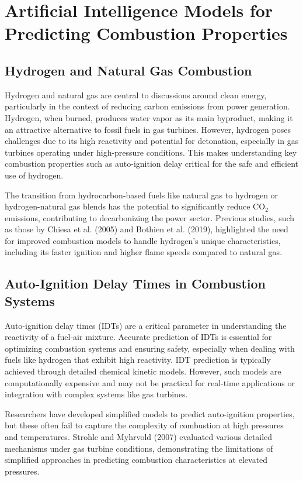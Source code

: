 \documentclass[12pt]{report}
\begin{document}


\section{Artificial Intelligence Models for Predicting Combustion Properties}

\subsection{Hydrogen and Natural Gas Combustion}
Hydrogen and natural gas are central to discussions around clean energy, particularly in the context of reducing carbon emissions from power generation. Hydrogen, when burned, produces water vapor as its main byproduct, making it an attractive alternative to fossil fuels in gas turbines. However, hydrogen poses challenges due to its high reactivity and potential for detonation, especially in gas turbines operating under high-pressure conditions. This makes understanding key combustion properties such as auto-ignition delay critical for the safe and efficient use of hydrogen.

The transition from hydrocarbon-based fuels like natural gas to hydrogen or hydrogen-natural gas blends has the potential to significantly reduce CO$_2$ emissions, contributing to decarbonizing the power sector. Previous studies, such as those by Chiesa et al. (2005) and Bothien et al. (2019), highlighted the need for improved combustion models to handle hydrogen’s unique characteristics, including its faster ignition and higher flame speeds compared to natural gas.

\subsection{Auto-Ignition Delay Times in Combustion Systems}
Auto-ignition delay times (IDTs) are a critical parameter in understanding the reactivity of a fuel-air mixture. Accurate prediction of IDTs is essential for optimizing combustion systems and ensuring safety, especially when dealing with fuels like hydrogen that exhibit high reactivity. IDT prediction is typically achieved through detailed chemical kinetic models. However, such models are computationally expensive and may not be practical for real-time applications or integration with complex systems like gas turbines.

Researchers have developed simplified models to predict auto-ignition properties, but these often fail to capture the complexity of combustion at high pressures and temperatures. Strohle and Myhrvold (2007) evaluated various detailed mechanisms under gas turbine conditions, demonstrating the limitations of simplified approaches in predicting combustion characteristics at elevated pressures.
\end{document}
